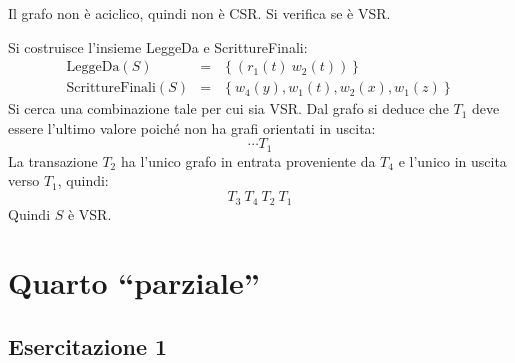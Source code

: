 \documentclass[a4paper]{article}
\newcommand{\dquotes}[1]{``#1''}
\begin{document}
	\noindent
	Il grafo non è aciclico, quindi non è CSR. Si verifica se è VSR.\newline

	\noindent
	Si costruisce l'insieme LeggeDa e ScrittureFinali:
	\begin{equation*}
		\begin{array}{lll}
			\text{LeggeDa}\left(S\right) 			&=& \left\{\left(r_{1}\left(t\right) \: w_{2}\left(t\right)\right)\right\} \\
			\text{ScrittureFinali}\left(S\right)	&=& \left\{w_{4}\left(y\right), w_{1}\left(t\right), w_{2}\left(x\right), w_{1}\left(z\right)\right\}
		\end{array}
	\end{equation*}
	Si cerca una combinazione tale per cui sia VSR. Dal grafo si deduce che $T_{1}$ deve essere l'ultimo valore poiché non ha grafi orientati in uscita:
	\begin{equation*}
		\cdots T_{1}
	\end{equation*}
	La transazione $T_{2}$ ha l'unico grafo in entrata proveniente da $T_{4}$ e l'unico in uscita verso $T_{1}$, quindi:
	\begin{equation*}
		T_{3} \: T_{4} \: T_{2} \: T_{1}
	\end{equation*}
	Quindi $S$ è VSR.\newpage
	
	\section{Quarto \dquotes{parziale}}
	
	\subsection{Esercitazione 1}\label{par: Esercitazione 1}
	
\end{document}
